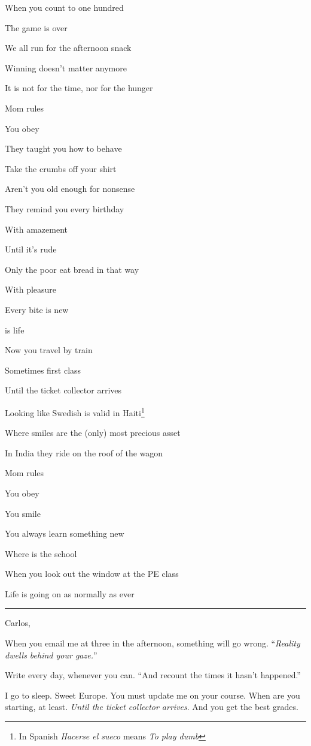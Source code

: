 \documentclass[]{book}
\let\rmarkdownfootnote\footnote%
\def\footnote{\protect\rmarkdownfootnote}
\begin{document}
When you count to one hundred

The game is over

We all run for the afternoon snack

Winning doesn't matter anymore

It is not for the time, nor for the hunger

Mom rules

You obey

They taught you how to behave

Take the crumbs off your shirt

Aren't you old enough for nonsense

They remind you every birthday

With amazement

Until it's rude

Only the poor eat bread in that way

With pleasure

Every bite is new

is life

Now you travel by train

Sometimes first class

Until the ticket collector arrives

Looking like Swedish is valid in Haiti\footnote{In Spanish \emph{Hacerse el sueco} means \emph{To play dumb}}

Where smiles are the (only) most precious asset

In India they ride on the roof of the wagon

Mom rules

You obey

You smile

You always learn something new

Where is the school

When you look out the window at the PE class

Life is going on as normally as ever

\begin{center}\rule{0.5\linewidth}{\linethickness}\end{center}

Carlos,

When you email me at three in the afternoon, something will go wrong. ``\emph{Reality dwells behind your gaze.}''

Write every day, whenever you can. ``And recount the times it hasn't happened.''

I go to sleep. Sweet Europe. You must update me on your course. When are you starting, at least. \emph{Until the ticket collector arrives}. And you get the best grades.
\end{document}
